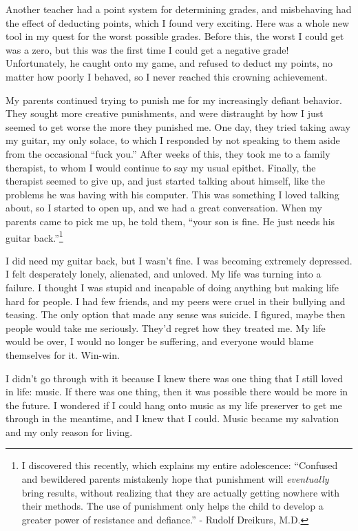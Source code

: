 Another teacher had a point system for determining grades, and misbehaving had the effect of deducting points, which I found very exciting. Here was a whole new tool in my quest for the worst possible grades. Before this, the worst I could get was a zero, but this was the first time I could get a negative grade! Unfortunately, he caught onto my game, and refused to deduct my points, no matter how poorly I behaved, so I never reached this crowning achievement.

My parents continued trying to punish me for my increasingly defiant behavior. They sought more creative punishments, and were distraught by how I just seemed to get worse the more they punished me. One day, they tried taking away my guitar, my only solace, to which I responded by not speaking to them aside from the occasional ``fuck you.'' After weeks of this, they took me to a family therapist, to whom I would continue to say my usual epithet. Finally, the therapist seemed to give up, and just started talking about himself, like the problems he was having with his computer. This was something I loved talking about, so I started to open up, and we had a great conversation. When my parents came to pick me up, he told them, ``your son is fine. He just needs his guitar back.''\footnote{I discovered this recently, which explains my entire adolescence: ``Confused and bewildered parents mistakenly hope that punishment will \emph{eventually} bring results, without realizing that they are actually getting nowhere with their methods. The use of punishment only helps the child to develop a greater power of resistance and defiance.'' - Rudolf Dreikurs, M.D.}

I did need my guitar back, but I wasn't fine. I was becoming extremely depressed. I felt desperately lonely, alienated, and unloved. My life was turning into a failure. I thought I was stupid and incapable of doing anything but making life hard for people. I had few friends, and my peers were cruel in their bullying and teasing. The only option that made any sense was suicide. I figured, maybe then people would take me seriously. They'd regret how they treated me. My life would be over, I would no longer be suffering, and everyone would blame themselves for it. Win-win.

I didn't go through with it because I knew there was one thing that I still loved in life: music. If there was one thing, then it was possible there would be more in the future. I wondered if I could hang onto music as my life preserver to get me through in the meantime, and I knew that I could. Music became my salvation and my only reason for living.

